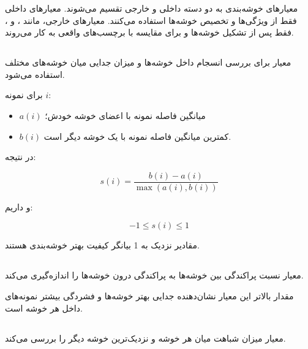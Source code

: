 \documentclass[12pt,a4paper,oneside]{report}
\begin{document}
معیارهای خوشه‌بندی به دو دسته داخلی و خارجی تقسیم می‌شوند. معیارهای داخلی فقط از ویژگی‌ها و تخصیص خوشه‌ها استفاده می‌کنند. معیارهای خارجی، مانند
،
و
،
فقط پس از تشکیل خوشه‌ها و برای مقایسه با برچسب‌های واقعی به کار می‌روند.


\subsection{}

معیار
برای بررسی انسجام داخل خوشه‌ها و میزان جدایی میان خوشه‌های مختلف استفاده می‌شود.

برای نمونه $i$:

\begin{itemize}
	\item $a(i)$ میانگین فاصله نمونه با اعضای خوشه خودش؛
	\item $b(i)$ کمترین میانگین فاصله نمونه با یک خوشه دیگر است.
\end{itemize}

در نتیجه:

\begin{equation}
s(i)
=
\frac{
b(i)-a(i)
}{
\max(a(i),b(i))
}
\end{equation}

و داریم:

\begin{equation}
-1
\leq
s(i)
\leq
1
\end{equation}

مقادیر نزدیک به 1 بیانگر کیفیت بهتر خوشه‌بندی هستند.

\subsection{}

معیار
نسبت پراکندگی بین خوشه‌ها به پراکندگی درون خوشه‌ها را اندازه‌گیری می‌کند.

مقدار بالاتر این معیار نشان‌دهنده جدایی بهتر خوشه‌ها و فشردگی بیشتر نمونه‌های داخل هر خوشه است.

\subsection{}

معیار
میزان شباهت میان هر خوشه و نزدیک‌ترین خوشه دیگر را بررسی می‌کند.
\end{document}
